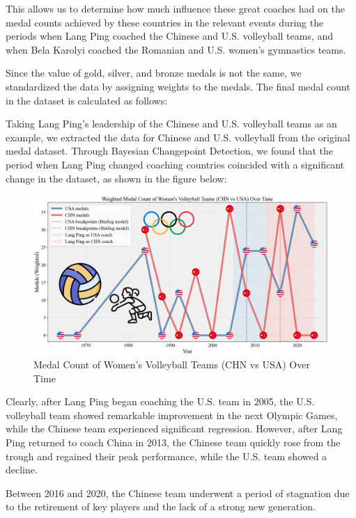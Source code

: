 \documentclass[12pt]{article}  %
\begin{document}
This allows us to determine how much influence these great coaches had on the medal counts achieved by these countries in the relevant events during the periods when Lang Ping coached the Chinese and U.S. volleyball teams, and when Bela Karolyi coached the Romanian and U.S. women's gymnastics teams.

Since the value of gold, silver, and bronze medals is not the same, we standardized the data by assigning weights to the medals. The final medal count in the dataset is calculated as follows: 







Taking Lang Ping's leadership of the Chinese and U.S. volleyball teams as an example, we extracted the data for Chinese and U.S. volleyball from the original medal dataset. Through Bayesian Changepoint Detection, we found that the period when Lang Ping changed coaching countries coincided with a significant change in the dataset, as shown in the figure below:



\begin{figure}[H]
	\centering
	\includegraphics[width=12cm]{img/Volleyball.png}
	\caption{Medal Count of Women's Volleyball Teams (CHN vs USA) Over Time}
	\label{fig:aa}
\end{figure}
Clearly, after Lang Ping began coaching the U.S. team in 2005, the U.S. volleyball team showed remarkable improvement in the next Olympic Games, while the Chinese team experienced significant regression. However, after Lang Ping returned to coach China in 2013, the Chinese team quickly rose from the trough and regained their peak performance, while the U.S. team showed a decline.

Between 2016 and 2020, the Chinese team underwent a period of stagnation due to the retirement of key players and the lack of a strong new generation.
\end{document}
